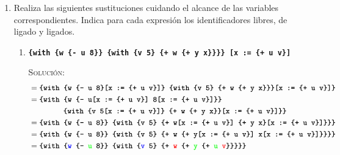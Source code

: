 \documentclass[letterpaper,11pt]{article}
\begin{document}
\begin{enumerate}
\begin{proof}
        \newpage
        Así, 
        \begin{center}
            \texttt{(length (ligada e)) $= 5 \not \leq 1$ (length (de-ligado e))}
        \end{center}

        Por lo tanto, la desigualdad \texttt{(length (ligada e)) $\leq$ 
        (length (de-ligado e))} es falsa.

    \end{proof}

    \item Realiza las siguientes sustituciones cuidando el alcance de las 
    variables correspondientes. Indica para cada expresión los identificadores 
    libres, de ligado y ligados. 
    
    \begin{enumerate}
        \item \texttt{\textbf{\{with \{w \{- u 8\}\} \{with \{v 5\} 
        \{+ w \{+ y x\}\}\}\} {[}x := \{+ u v\}{]}}}

        \textsc{Solución:}
        \begin{align*}
            &= \texttt{\textbf{\{with \{w \{- u 8\}[x := \{+ u v\}]\} 
               \{with \{v 5\} \{+ w \{+ y x\}\}\}[x := \{+ u v\}]\}}} \\
            &= \texttt{\textbf{\{with \{w \{- u[x := \{+ u v\}] 
                                              8[x := \{+ u v\}]\}\}}} \\ 
            &\; \; \; \; \; \; \; \; \; \; \; \; \; \; \; \; 
            \texttt{\textbf{\{with \{v 5[x := \{+ u v\}]\} 
                                   \{+ w \{+ y x\}\}[x := \{+ u v\}]\}\}}} \\
            &= \texttt{\textbf{\{with \{w \{- u 8\}\} 
                                      \{with \{v 5\} \{+ w[x := \{+ u v\}] 
                                             \{+ y x\}[x := \{+ u v\}]\}\}\}}} \\
            &= \texttt{\textbf{\{with \{w \{- u 8\}\} 
                                      \{with \{v 5\} \{+ w \{+ y[x := \{+ u v\}] 
                                                         x[x := \{+ u v\}]\}\}\}\}}} \\
            &= \texttt{\textbf{\{with \{\textcolor{blue}{w} 
                                      \{- \textcolor{green}{u} 8\}\} 
                                      \{with \{\textcolor{blue}{v} 5\} 
                                             \{+ \textcolor{red}{w} 
                                             \{+ \textcolor{green}{y} 
                                             \{+ \textcolor{green}{u} 
                                             \textcolor{red}{v}\}\}\}\}\}}}
        \end{align*}
    

\end{enumerate}
\end{enumerate}
\end{document}
